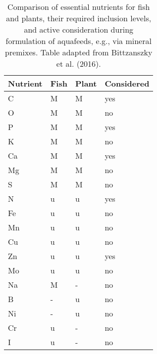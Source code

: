 \begin{table}
\centering
  \caption{Comparison of essential nutrients for fish and plants, their required inclusion levels, and active consideration during formulation of aquafeeds, e.g., via mineral premixes. Table adapted from Bittzanszky et al. (2016).}
  \label{tab:essentials}
  \begin{tabularx}{\textwidth}{XXXX}

\toprule

Nutrient & Fish & Plant & Considered \\

\midrule
C & M & M & yes\\
O & M & M & no\\
P & M & M & yes\\
K & M & M & no\\
Ca & M & M & yes\\
Mg & M & M & no\\
S & M & M & no\\

N & u & u & yes\\
Fe & u & u & no\\
Mn & u & u & no\\
Cu & u & u & no\\
Zn & u & u & yes\\
Mo & u & u & no\\

\hline

Na & M & - & no\\
B & - & u & no\\
Ni & - & u & no\\
Cr & u & - & no\\
I & u & - & no\\


\bottomrule

  \end{tabularx}
\end{table}